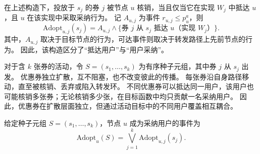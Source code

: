 \documentclass[sigconf,balance=false]{acmart}
\begin{document}
在上述构造下，投放于 $s_j$ 的券 $j$ 被节点 $u$ 核销，当且仅当它在实现 $W_j$ 中抵达 $u$，且 $u$ 在该实现中采取采纳行为。
记 $A_{u,j}$ 为事件 $r_{u,j}\leq p_u^a$，则
\[
  \mathrm{Adopt}_{u,j}(s_j)
  = A_{u,j}\wedge
    \{\text{券 }j\text{ 从 }s_j\text{ 抵达 }u\text{（实现 }W_j\text{）}\}.
\]
其中，$A_{u,j}$ 取决于目标节点的行为，可达事件则取决于转发路径上先前节点的行为。
因此，该构造区分了“抵达用户”与“用户采纳”。

对于含 $k$ 张券的活动，令 $S=(s_1,\ldots,s_k)$ 为有序种子元组，其中券 $j$ 从 $s_j$ 出发。
优惠券独立扩散，互不阻塞，也不改变彼此的传播。
每张券沿自身路径移动，直至被核销、丢弃或陷入转发环。
不同优惠券可以抵达同一用户，该用户也可能核销多张券；无论核销多少张，在目标函数中均只贡献一名采纳用户。
因此，优惠券在扩散层面独立，但通过活动目标中的不同用户覆盖相互耦合。

给定种子元组 $S=(s_1,\ldots,s_k)$，节点 $u$ 成为采纳用户的事件为
\[
  \mathrm{Adopt}_u(S) = \bigvee_{j=1}^{k} \mathrm{Adopt}_{u,j}(s_j).
\]
\end{document}

